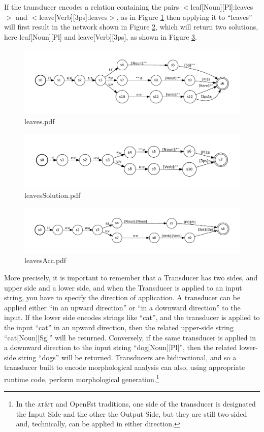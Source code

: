 \documentclass[letterpaper,12pt]{article}
\providecommand{\acro}{}\renewcommand{\acro}{\textsc}
\begin{document}
If the transducer encodes a relation containing the pairs $<$leaf[Noun][Pl]:leaves$>$ and
$<$leave[Verb][3ps]:leaves$>$, as in Figure \ref{fig:leaves} then
applying it to ``leaves'' will first result in the
network shown in Figure \ref{fig:leavesSolution}, which will return two solutions, here leaf[Noun][Pl] and leave[Verb][3ps],
as shown in Figure \ref{fig:leavesAcc}.

\begin{figure}
\includegraphics[width=15cm]{images/leaves}
\caption{leaves.pdf}
\label{fig:leaves}
\end{figure}

\begin{figure}
\includegraphics[width=15cm]{images/leavesSolution}
\caption{leavesSolution.pdf}
\label{fig:leavesSolution}
\end{figure}

\begin{figure}
\includegraphics[width=15cm]{images/leavesAcc}
\caption{leavesAcc.pdf}
\label{fig:leavesAcc}
\end{figure}


More precisely, it is important to remember that a Transducer has two sides, and upper side and a lower
side, and when the Transducer is applied to an input string, you have to specify the direction of
application.  A transducer can be applied either ``in an upward
direction'' or ``in a downward direction'' to the input.  If the lower side encodes strings like ``cat'', and the
transducer is applied to the input ``cat'' in an upward direction, then the related upper-side string
``cat[Noun][Sg]'' will be returned.  Conversely, if the same transducer is applied in a downward
direction to the input string ``dog[Noun][Pl]'', then the related lower-side string ``dogs'' will be
returned.  Transducers are bidirectional, and so a transducer built to
encode morphological analysis
can also, using appropriate runtime code, perform morphological generation.\footnote{In the \acro{at\&t} and OpenFst traditions, one side of the transducer is
designated the Input Side and the other the Output Side, but they are still two-sided and, technically,
can be applied in either direction.}
\end{document}
